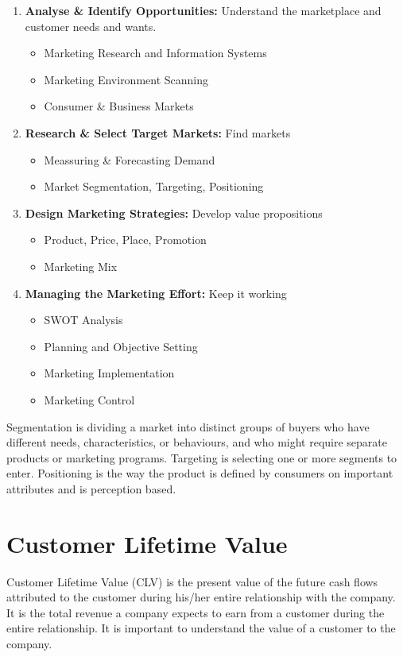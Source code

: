 \begin{enumerate}
	\item \textbf{Analyse & Identify Opportunities:} Understand the marketplace and customer needs and wants.		
		\begin{itemize}
			\item Marketing Research and Information Systems
			\item Marketing Environment Scanning
			\item Consumer & Business Markets
		\end{itemize}
	\item \textbf{Research & Select Target Markets:} Find markets		
		\begin{itemize}
			\item Meassuring & Forecasting Demand
			\item Market Segmentation, Targeting, Positioning
		\end{itemize}
	\item \textbf{Design Marketing Strategies:} Develop value propositions	
		\begin{itemize}
			\item Product, Price, Place, Promotion
			\item Marketing Mix
		\end{itemize}
	\item \textbf{Managing the Marketing Effort:} Keep it working
		\begin{itemize}
			\item SWOT Analysis
			\item Planning and Objective Setting
			\item Marketing Implementation
			\item Marketing Control
		\end{itemize}
\end{enumerate}

Segmentation is dividing a market into distinct groups of buyers who have different needs, characteristics, or behaviours, and who might require separate products or marketing programs. Targeting is selecting one or more segments to enter. Positioning is the way the product is defined by consumers on important attributes and is perception based.

\section{Customer Lifetime Value}
Customer Lifetime Value (CLV) is the present value of the future cash flows attributed to the customer during his/her entire relationship with the company. It is the total revenue a company expects to earn from a customer during the entire relationship. It is important to understand the value of a customer to the company.

